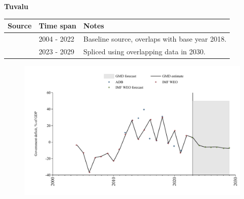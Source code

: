 \documentclass[12pt,a4paper,landscape]{article}
\begin{document}
\begin{adjustbox}{max totalsize={\paperwidth}{\paperheight},center}
\begin{minipage}[t][\textheight][t]{\textwidth}
\vspace*{0.5cm}
{}
\begin{center}
{\Large\bfseries Tuvalu}
\end{center}
\vspace{0.5cm}
\begin{table}[H]
\centering
\small
\begin{tabular}{|l|l|l|}
\hline
\textbf{Source} & \textbf{Time span} & \textbf{Notes} \\
\hline
\rowcolor{white}\cite{IMF_WEO}& 2004 - 2022 &Baseline source, overlaps with base year 2018.\\
\rowcolor{lightgray}\cite{IMF_WEO_forecast}& 2023 - 2029 &Spliced using overlapping data in 2030.\\
\hline
\end{tabular}
\end{table}
\begin{figure}[H]
\centering
\includegraphics[width=\textwidth,height=0.6\textheight,keepaspectratio]{graphs/TUV_govdef_GDP.pdf}
\end{figure}
\end{minipage}
\end{adjustbox}
\end{document}

